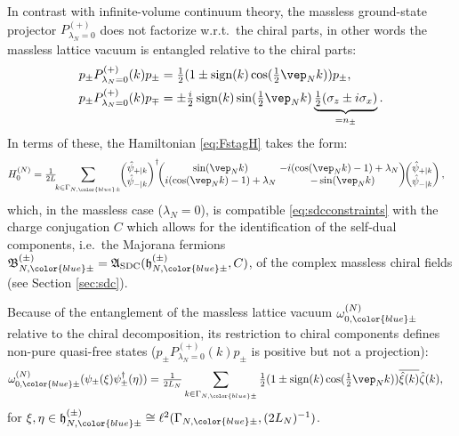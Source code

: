 \documentclass[a4paper, 11pt]{article}
\newcommand{\fA}{\mathfrak{A}}\newcommand{\cA}{\mathcal{A}}\newcommand{\dA}{\mathds{A}}\newcommand{\sA}{\mathscr{A}}
\newcommand{\fB}{\mathfrak{B}}\newcommand{\cB}{\mathcal{B}}\newcommand{\dB}{\mathds{B}}\newcommand{\sB}{\mathscr{B}}
\newcommand{\fh}{\mathfrak{h}}
\newcommand{\ltwo}{\ell^{2}}
\DeclareMathOperator{\1}{\mathds{1}}
\DeclareMathOperator{\SDC}{\textup{SDC}}
\DeclareMathOperator{\sign}{\textup{sign}}
\begin{document}
In contrast with infinite-volume continuum theory, the massless ground-state projector $P^{(+)}_{\lambda_{N}=0}$ does not factorize w.r.t.~the chiral parts, in other words the massless lattice vacuum is entangled relative to the chiral parts:
\begin{align}
\label{eq:chiralentanglement}
p_{\pm}P^{(+)}_{\lambda_{N}=0}(k)p_{\pm} & = \tfrac{1}{2}(1\pm\sign(k)\cos(\tfrac{1}{2}\vep_{N}k))p_{\pm}, \\ \nonumber
p_{\pm}P^{(+)}_{\lambda_{N}=0}(k)p_{\mp} & = \pm\tfrac{i}{2}\sign(k)\sin(\tfrac{1}{2}\vep_{N}k)\underbrace{\tfrac{1}{2}(\sigma_{z}\pm i\sigma_{x})}_{=n_{\pm}}.
\end{align}
In terms of these, the Hamiltonian \eqref{eq:FstagH} takes the form:
\begin{align}
\label{eq:FstagHchiral}
H^{(N)}_{0} & = \tfrac{1}{2L}\!\!\sum_{k\in\Gamma_{N,{\color{blue}\pm}}}\!\!\begin{pmatrix} \hat{\psi}_{+|k} \\ \hat{\psi}_{-|k} \end{pmatrix}^{\dagger}\!\! \begin{pmatrix} \sin(\vep_{N}k) & \!\!\!\!-i(\cos(\vep_{N}k)-1) + \lambda_{N} \\ i(\cos(\vep_{N}k)-1) + \lambda_{N} & -\sin(\vep_{N}k) \end{pmatrix}\!\! \begin{pmatrix} \hat{\psi}_{+|k} \\ \hat{\psi}_{-|k} \end{pmatrix},
\end{align}
which, in the massless case ($\lambda_{N}=0$), is compatible \eqref{eq:sdcconstraints} with the charge conjugation $C$ which allows for the identification of the self-dual components, i.e.~the Majorana fermions $\fB^{(\pm)}_{N,{\color{blue}\pm}}=\fA_{\SDC}(\fh^{(\pm)}_{N,{\color{blue}\pm}},C)$, of the complex massless chiral fields (see Section \ref{sec:sdc}).

\bigskip

Because of the entanglement of the massless lattice vacuum $\omega^{(N)}_{0,{\color{blue}\pm}}$ relative to the chiral decomposition, its restriction to chiral components defines non-pure quasi-free states ($p_{\pm}P^{(+)}_{\lambda_{N}=0}(k)p_{\pm}$ is positive but not a projection):
\begin{align}
\label{eq:chiral2p}
\omega^{(N)}_{0,{\color{blue}\pm}}(\psi_{\pm}(\xi)\psi_{\pm}^{\dagger}(\eta)) & = \tfrac{1}{2 L_{N}}\sum_{k\in\Gamma_{N,{\color{blue}\pm}}}\tfrac{1}{2}(1\pm\sign(k)\cos(\tfrac{1}{2}\vep_{N}k))\overline{\hat{\xi}(k)}\hat{\zeta}(k),
\end{align}
for $\xi,\eta\in\fh^{(\pm)}_{N,{\color{blue}\pm}}\cong\ltwo(\Gamma_{N,{\color{blue}\pm}},(2 L_{N})^{-1})$.
\end{document}
